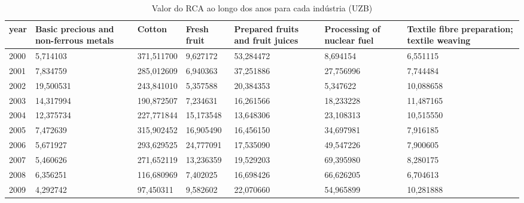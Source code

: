 \begin{table}
\centering
\caption{Valor do RCA ao longo dos anos para cada indústria (UZB)}
\begin{tabular}{p{1cm}p{2cm}p{2cm}p{2cm}p{2cm}p{2cm}p{2cm}}
\toprule
 year &  Basic precious and non-ferrous metals &     Cotton &  Fresh fruit &  Prepared fruits and fruit juices &  Processing of nuclear fuel &  Textile fibre preparation; textile weaving \\
\midrule
 2000 &                               5,714103 & 371,511700 &     9,627172 &                         53,284472 &                    8,694154 &                                    6,551115 \\
 2001 &                               7,834759 & 285,012609 &     6,940363 &                         37,251886 &                   27,756996 &                                    7,744484 \\
 2002 &                              19,500531 & 243,841010 &     5,357588 &                         20,384353 &                    5,347622 &                                   10,088658 \\
 2003 &                              14,317994 & 190,872507 &     7,234631 &                         16,261566 &                   18,233228 &                                   11,487165 \\
 2004 &                              12,375734 & 227,771844 &    15,173548 &                         13,648306 &                   23,108313 &                                   10,515550 \\
 2005 &                               7,472639 & 315,902452 &    16,905490 &                         16,456150 &                   34,697981 &                                    7,916185 \\
 2006 &                               5,671927 & 293,629525 &    24,777091 &                         17,535090 &                   49,547226 &                                    7,900605 \\
 2007 &                               5,460626 & 271,652119 &    13,236359 &                         19,529203 &                   69,395980 &                                    8,280175 \\
 2008 &                               6,356251 & 116,680969 &     7,402025 &                         16,698426 &                   66,626205 &                                    6,704613 \\
 2009 &                               4,292742 &  97,450311 &     9,582602 &                         22,070660 &                   54,965899 &                                   10,281888 \\

\end{tabular}
\end{table}
